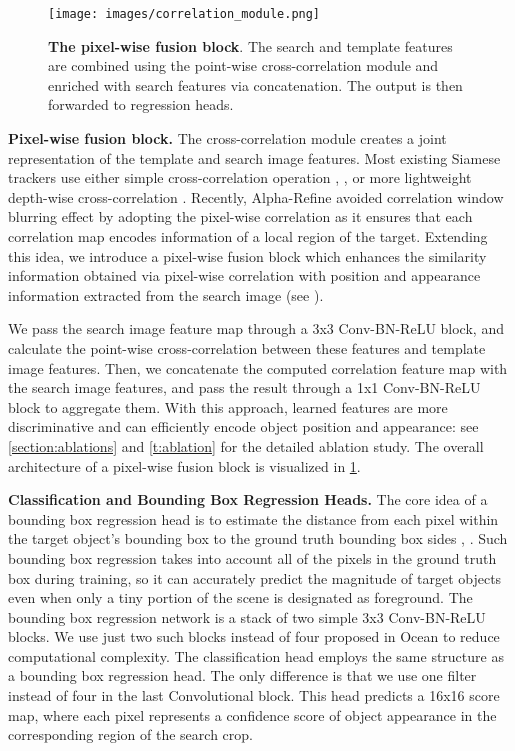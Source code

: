 \documentclass[runningheads]{llncs}
\begin{document}
\begin{figure}[t]\centering
  \texttt{[image: images/correlation\_module.png]}
\caption{\textbf{The pixel-wise fusion block}. The search and template features are combined using the point-wise cross-correlation module and enriched with search features via concatenation. The output is then forwarded to regression heads. }
\label{fig:mobile_corr}
\end{figure}

\textbf{Pixel-wise fusion block.}\label{para} The cross-correlation module creates a joint representation of the template and search image features. 
Most existing Siamese trackers use either simple cross-correlation operation \cite{SiamFC}, \cite{SiamFC++}, \cite{SiamRPN} or more lightweight depth-wise cross-correlation \cite{SiamRPN++}. 
Recently, Alpha-Refine \cite{AlphaRef} avoided correlation window blurring effect by adopting the pixel-wise correlation as it ensures that each correlation map encodes information of a local region of the target.
Extending this idea, we introduce a pixel-wise fusion block which enhances the similarity information obtained via pixel-wise correlation with position and appearance information extracted from the search image (see ). 

We pass the search image feature map through a 3x3 Conv-BN-ReLU block, and calculate the point-wise cross-correlation between these features and template image features.
Then, we concatenate the computed correlation feature map with the search image features, and pass the result through a 1x1 Conv-BN-ReLU block to aggregate them. 
With this approach, learned features are more discriminative and can efficiently encode object position and appearance: see \cref{section:ablations} and \cref{t:ablation} for the detailed ablation study. 
The overall architecture of a pixel-wise fusion block is visualized in \cref{fig:mobile_corr}.




\textbf{Classification and Bounding Box Regression Heads.} The core idea of a bounding box regression head is to estimate the distance from each pixel within the target object's bounding box to the ground truth bounding box sides \cite{Ocean}, \cite{FCOS}.
Such bounding box regression takes into account all of the pixels in the ground truth box during training, so it can accurately predict the magnitude of target objects even when only a tiny portion of the scene is designated as foreground.
The bounding box regression network is a stack of two simple 3x3 Conv-BN-ReLU blocks. We use just two such blocks instead of four proposed in Ocean \cite{Ocean} to reduce computational complexity.
The classification head employs the same structure as a bounding box regression head. The only difference is that we use one filter instead of four in the last Convolutional block. This head predicts a 16x16 score map, where each pixel represents a confidence score of object appearance in the corresponding region of the search crop.
\end{document}
